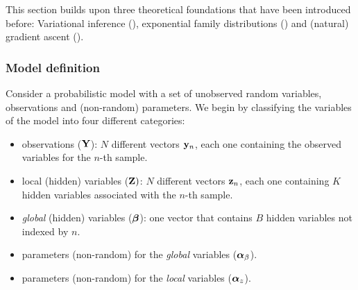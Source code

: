 This section builds upon three theoretical foundations that have been introduced before: Variational inference (), exponential family distributions () and (natural) gradient ascent ().






\subsubsection{Model definition}

Consider a probabilistic model with a set of unobserved random variables, observations and (non-random) parameters. We begin by classifying the variables of the model into four different categories:

\begin{itemize}
	\item observations (${\bf Y}$): $N$ different vectors ${\bf y}_{n}$, each one containing the observed variables for the $n$-th sample.
	\item local (hidden) variables (${\bf Z})$: $N$ different vectors ${\bf z}_{n}$, each one containing $K$ hidden variables associated with the $n$-th sample.
	\item \textit{global} (hidden) variables ($\mbox{\boldmath $\beta$}$): one vector that contains $B$ hidden variables not indexed by $n$.
	\item parameters (non-random) for the \textit{global} variables ($\mbox{\boldmath $\alpha$}_{\beta}$).
	\item parameters (non-random) for the \textit{local} variables ($\mbox{\boldmath $\alpha$}_{z}$).
\end{itemize}

